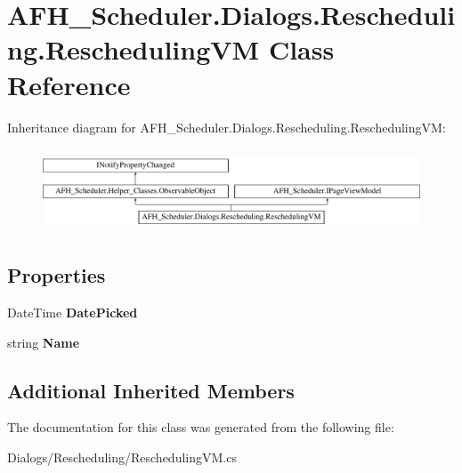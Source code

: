 \section{A\+F\+H\+\_\+\+Scheduler.\+Dialogs.\+Rescheduling.\+Rescheduling\+VM Class Reference}
\label{class_a_f_h___scheduler_1_1_dialogs_1_1_rescheduling_1_1_rescheduling_v_m}
Inheritance diagram for A\+F\+H\+\_\+\+Scheduler.\+Dialogs.\+Rescheduling.\+Rescheduling\+VM\+:\begin{figure}[H]
\begin{center}
\leavevmode
\includegraphics[height=2.492581cm]{class_a_f_h___scheduler_1_1_dialogs_1_1_rescheduling_1_1_rescheduling_v_m}
\end{center}
\end{figure}
\subsection*{Properties}
\begin{DoxyCompactItemize}
\item 
\mbox{\label{class_a_f_h___scheduler_1_1_dialogs_1_1_rescheduling_1_1_rescheduling_v_m_a1506ca8817ec2014a0154062bc596ea9}} 
Date\+Time {\bfseries Date\+Picked}\hspace{0.3cm}{\ttfamily  [get, set]}
\item 
\mbox{\label{class_a_f_h___scheduler_1_1_dialogs_1_1_rescheduling_1_1_rescheduling_v_m_a64e9e94014970eb7fbb577e53b6c7a05}} 
string {\bfseries Name}\hspace{0.3cm}{\ttfamily  [get]}
\end{DoxyCompactItemize}
\subsection*{Additional Inherited Members}


The documentation for this class was generated from the following file\+:\begin{DoxyCompactItemize}
\item 
Dialogs/\+Rescheduling/Rescheduling\+V\+M.\+cs\end{DoxyCompactItemize}
